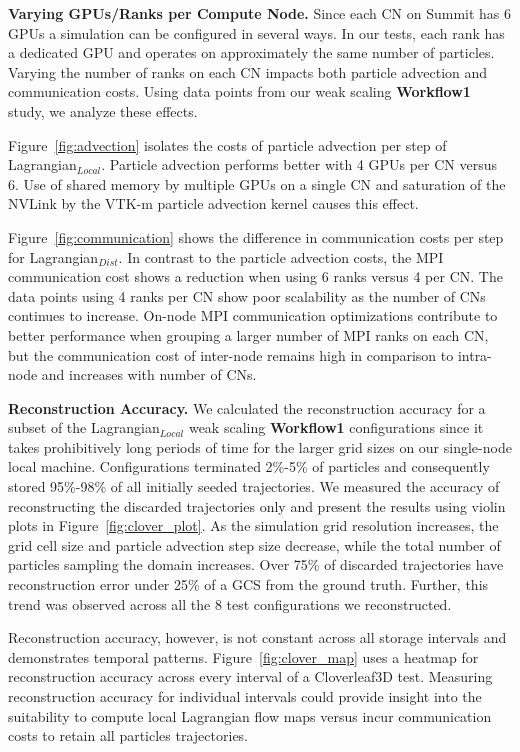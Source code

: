 \textbf{Varying GPUs/Ranks per Compute Node.}
Since each CN on Summit has 6 GPUs a simulation can be configured in several ways.
%
In our tests, each rank has a dedicated GPU and operates on approximately the same number of particles.
%
Varying the number of ranks on each CN impacts both particle advection and communication costs.
%
Using data points from our weak scaling \textbf{Workflow1} study, we analyze these effects.
%

Figure~\ref{fig:advection} isolates the costs of particle advection per step of Lagrangian$_{Local}$.
%
Particle advection performs better with 4 GPUs per CN versus 6.
%
Use of shared memory by multiple GPUs on a single CN and saturation of the NVLink by the VTK-m particle advection kernel causes this effect.
%

Figure~\ref{fig:communication} shows the difference in communication costs per step for Lagrangian$_{Dist}$.
%
In contrast to the particle advection costs, the MPI communication cost shows a reduction when using 6 ranks versus 4 per CN. 
%
The data points using 4 ranks per CN show poor scalability as the number of CNs continues to increase.
%
On-node MPI communication optimizations contribute to better performance when grouping a larger number of MPI ranks on each CN, but the communication cost of inter-node remains high in comparison to intra-node and increases with number of CNs.

%
%

\textbf{Reconstruction Accuracy.}
We calculated the reconstruction accuracy for a subset of the Lagrangian$_{Local}$ weak scaling \textbf{Workflow1} configurations since it takes prohibitively long periods of time for the larger grid sizes on our single-node local machine.
%
Configurations terminated 2\%-5\% of particles and consequently stored 95\%-98\% of all initially seeded trajectories. 
%
We measured the accuracy of reconstructing the discarded trajectories only and present the results using violin plots in Figure~\ref{fig:clover_plot}.
%
As the simulation grid resolution increases, the grid cell size and particle advection step size decrease, while the total number of particles sampling the domain increases. 
%
Over 75\% of discarded trajectories have reconstruction error under 25\% of a GCS from the ground truth.
%
Further, this trend was observed across all the 8 test configurations we reconstructed. 

Reconstruction accuracy, however, is not constant across all storage intervals and demonstrates temporal patterns.
%
%
Figure~\ref{fig:clover_map} uses a heatmap for reconstruction accuracy across every interval of a Cloverleaf3D test. 
%
Measuring reconstruction accuracy for individual intervals could provide insight into the suitability to compute local Lagrangian flow maps versus incur communication costs to retain all particles trajectories.
%

